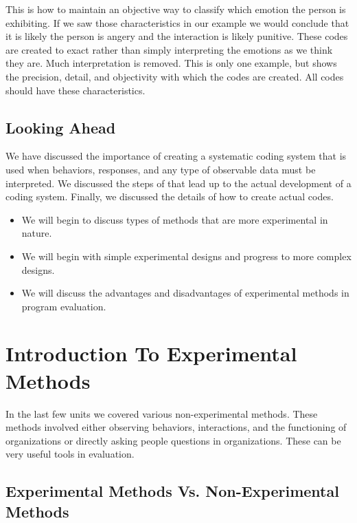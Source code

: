 \documentclass[]{book}
\theoremstyle{definition}
\theoremstyle{definition}
\theoremstyle{definition}
\theoremstyle{remark}
\begin{document}
This is how to maintain an objective way to classify which emotion the
person is exhibiting. If we saw those characteristics in our example we
would conclude that it is likely the person is angery and the
interaction is likely punitive. These codes are created to exact rather
than simply interpreting the emotions as we think they are. Much
interpretation is removed. This is only one example, but shows the
precision, detail, and objectivity with which the codes are created. All
codes should have these characteristics.

\hypertarget{looking-ahead-9}{%
\section{Looking Ahead}\label{looking-ahead-9}}

We have discussed the importance of creating a systematic coding system
that is used when behaviors, responses, and any type of observable data
must be interpreted. We discussed the steps of that lead up to the
actual development of a coding system. Finally, we discussed the details
of how to create actual codes.

\begin{itemize}
\item
  We will begin to discuss types of methods that are more experimental
  in nature.
\item
  We will begin with simple experimental designs and progress to more
  complex designs.
\item
  We will discuss the advantages and disadvantages of experimental
  methods in program evaluation.
\end{itemize}

\hypertarget{introduction-to-experimental-methods}{%
\chapter{Introduction To Experimental
Methods}\label{introduction-to-experimental-methods}}

In the last few units we covered various non-experimental methods. These
methods involved either observing behaviors, interactions, and the
functioning of organizations or directly asking people questions in
organizations. These can be very useful tools in evaluation.

\hypertarget{experimental-methods-vs.-non-experimental-methods}{%
\section{Experimental Methods Vs. Non-Experimental
Methods}\label{experimental-methods-vs.-non-experimental-methods}}
\end{document}
